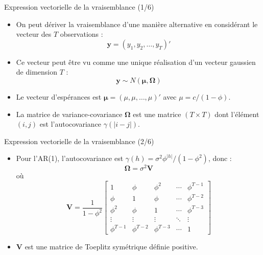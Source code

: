 \documentclass[11pt,aspectratio=169]{beamer}
\begin{document}
\begin{frame}{Expression vectorielle de la vraisemblance (1/6)}

\begin{itemize}

\item On peut dériver la vraisemblance d'une manière alternative en considérant le vecteur des $T$ observations :
  \[
  \mathbf{y} = (y_1, y_2, \ldots, y_T)'
  \]\newline

\item Ce vecteur peut être vu comme une unique réalisation d'un vecteur gaussien de dimension $T$ :
  \[
  \mathbf{y} \sim N(\bm{\mu}, \bm{\Omega})
  \]\newline

\item Le vecteur d'espérances est $\bm{\mu} = (\mu, \mu, \ldots, \mu)'$ avec $\mu = c/(1 - \phi)$.\newline

\item La matrice de variance-covariance $\bm{\Omega}$ est une matrice $(T \times T)$ dont l'élément $(i, j)$ est l'autocovariance $\gamma(|i-j|)$.

\end{itemize}

\end{frame}

\begin{frame}{Expression vectorielle de la vraisemblance (2/6)}

\begin{itemize}

\item Pour l'AR(1), l'autocovariance est $\gamma(h) = \sigma^2 \phi^{|h|}/(1-\phi^2)$, donc :
  \[
  \bm{\Omega} = \sigma^2 \mathbf{V}
  \]
  où
  \[
  \mathbf{V} = \frac{1}{1-\phi^2} \begin{bmatrix} 1 & \phi & \phi^2 & \cdots & \phi^{T-1} \\ \phi & 1 & \phi & \cdots & \phi^{T-2} \\ \phi^2 & \phi & 1 & \cdots & \phi^{T-3} \\ \vdots & \vdots & \vdots & \ddots & \vdots \\ \phi^{T-1} & \phi^{T-2} & \phi^{T-3} & \cdots & 1 \end{bmatrix}
  \]\newline

\item $\mathbf{V}$ est une matrice de Toeplitz symétrique définie positive.

\end{itemize}

\end{frame}
\end{document}
